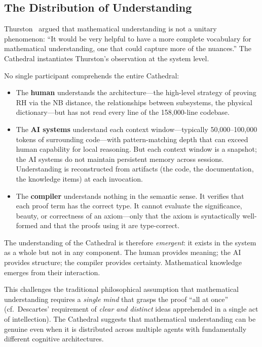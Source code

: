 \subsection{The Distribution of Understanding}

Thurston~\cite{thurston1994} argued that mathematical understanding
is not a unitary phenomenon: ``It would be very helpful to have
a more complete vocabulary for mathematical understanding, one
that could capture more of the nuances.'' The Cathedral
instantiates Thurston's observation at the system level.

No single participant comprehends the entire Cathedral:

\begin{itemize}
  \item The \textbf{human} understands the architecture---the
    high-level strategy of proving RH via the NB distance, the
    relationships between subsystems, the physical
    dictionary---but has not read every line of the 158{,}000-line
    codebase.

  \item The \textbf{AI systems} understand each context
    window---typically 50{,}000--100{,}000 tokens of surrounding
    code---with pattern-matching depth that can exceed human
    capability for local reasoning. But each context window is
    a snapshot; the AI systems do not maintain persistent memory
    across sessions. Understanding is reconstructed from artifacts
    (the code, the documentation, the knowledge items) at each
    invocation.

  \item The \textbf{compiler} understands nothing in the semantic
    sense. It verifies that each proof term has the correct type.
    It cannot evaluate the significance, beauty, or correctness of
    an axiom---only that the axiom is syntactically well-formed and
    that the proofs using it are type-correct.
\end{itemize}

The understanding of the Cathedral is therefore \emph{emergent}:
it exists in the system as a whole but not in any component. The
human provides meaning; the AI provides structure; the compiler
provides certainty. Mathematical knowledge emerges from their
interaction.

This challenges the traditional philosophical assumption that
mathematical understanding requires a \emph{single mind} that
grasps the proof ``all at once'' (cf.\ Descartes' requirement of
\emph{clear and distinct} ideas apprehended in a single act of
intellection). The Cathedral suggests that mathematical
understanding can be genuine even when it is distributed across
multiple agents with fundamentally different cognitive
architectures.

